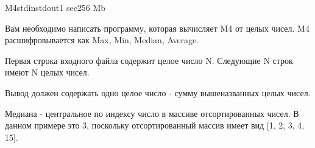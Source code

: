 \begin{problem}{M4}{stdin}{stdout}{1 sec}{256 Mb}

Вам необходимо написать программу, которая вычисляет M4 от целых чисел. M4 расшифровывается как Max, Min, Median, Average.

\InputFile

Первая строка входного файла содержит целое число N. Следующие N строк имеют N целых чисел.

\OutputFile

Вывод должен содержать одно целое число - сумму вышеназванных целых чисел.
\Example

\begin{example}
%
\end{example}

\Note

Медиана - центральное по индексу число в массиве отсортированных чисел. В данном примере это 3, поскольку
отсортированный массив имеет вид [1, 2, 3, 4, 15].

\end{problem}